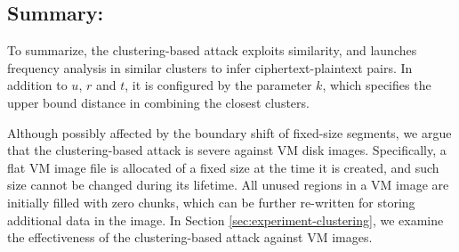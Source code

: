 

\subsection{Summary:}
To summarize, the clustering-based attack exploits similarity, and launches frequency analysis in similar clusters to infer ciphertext-plaintext pairs. In addition to  $u$, $r$ and $t$, it is configured by the parameter $k$, which specifies the upper bound distance in combining the closest clusters.   

Although possibly affected by the boundary shift of fixed-size segments, we argue that the clustering-based attack is severe against VM disk images. 
Specifically, a flat VM image file is allocated of a fixed size at the time it is created, and such size cannot be changed during its lifetime. All unused regions in a VM image are initially filled with  zero chunks, which can be further re-written for storing additional data in the image. 
In Section \ref{sec:experiment-clustering}, we examine the effectiveness of the clustering-based attack against VM images.

     

